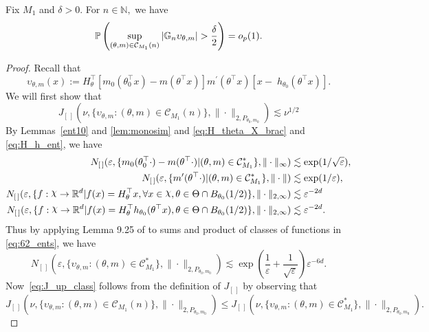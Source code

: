 {\begin{lemma}\label{LIP:lem:upsion_donskerity}
Fix $M_1$ and $ \delta>0.$ For $n\in \mathbb{N},$ we have
\[\p\left(\sup_{(\theta,m ) \in \mathcal{C}_{M_1}(n) } |\g_n \upsilon_{\theta, m}|> \frac{\delta}{2}\right) =o_p(1). \]
\end{lemma}
\begin{proof}
Recall that
\[\upsilon_{\theta, m}(x):={}    H_\theta^\top  [m_0(\theta_0^\top x) -m(\theta^\top x)]m^\prime (\theta^\top x)  [  x- \;h_{\theta_0} (\theta ^\top x)].\]
We will first show that
\begin{equation}\label{eq:J_up_class}
J_{[\,]}(\nu, \{  \upsilon_{\theta, m}:(\theta,m ) \in \mathcal{C}_{M_1}(n) \}, \|\cdot\|_{2,P_{\theta_0,m_0}})
\lesssim \nu^{1/2}
\end{equation}
By Lemmas~\ref{ent10} and \ref{lem:monosim} and \eqref{eq:H_theta_X_brac} and \eqref{eq:H_h_ent}, we have
\begin{align}
N_{[\,]}(\varepsilon,\{m_0(\theta_0^\top \cdot) -m(\theta^\top \cdot)| (\theta,m) \in  \mathcal{C}^*_{M_1}\}, \|\cdot\|_\infty ) &\lesssim \exp(1/\sqrt{\varepsilon}),\nonumber\\
N_{[\,]}(\varepsilon,\{m'(\theta^\top \cdot)| (\theta,m) \in  \mathcal{C}^*_{M_1}\}, \|\cdot\| ) &\lesssim \exp(1/\varepsilon),\label{eq:62_ents}\\
N_{[\,]}(\varepsilon, \{f:\rchi\rightarrow \R^d| f(x)=H_\theta^\top x, \forall x\in \rchi, \theta \in \Theta\cap B_{\theta_0}(1/2) \}, \|\cdot\|_{2,\infty}) &\lesssim \varepsilon^{-2d}\nonumber\\
N_{[\,]}(\varepsilon, \{f:\rchi\rightarrow \R^d| f(x)=H_\theta^\top h_{\theta_0}(\theta^\top x),  \theta \in \Theta\cap B_{\theta_0}(1/2) \}, \|\cdot\|_{2,\infty}) &\lesssim \varepsilon^{-2d}.\nonumber
\end{align}
Thus by applying Lemma 9.25 of \cite{Kosorok08} to sums and product of classes of functions in \eqref{eq:62_ents},  we have
\begin{equation}\label{eq:uppsilon_Lip_ent}
N_{[\,]}(\varepsilon, \{  \upsilon_{\theta, m}:(\theta,m ) \in \mathcal{C}^*_{M_1} \}, \|\cdot\|_{2,P_{\theta_0,m_0}}) \lesssim \exp{\left( \frac{1}{\varepsilon}+  \frac{1}{\sqrt\varepsilon}\right)} \varepsilon^{-6d}.
\end{equation}
Now~\eqref{eq:J_up_class} follows  from the definition of $J_{[\,]}$ by observing that \[
J_{[\,]}(\nu, \{  \upsilon_{\theta, m}:(\theta,m ) \in \mathcal{C}_{M_1}(n) \}, \|\cdot\|_{2,P_{\theta_0,m_0}}) \le J_{[\,]}(\nu, \{  \upsilon_{\theta, m}:(\theta,m ) \in \mathcal{C}^*_{M_1} \}, \|\cdot\|_{2,P_{\theta_0,m_0}}).\]

\end{proof}}
